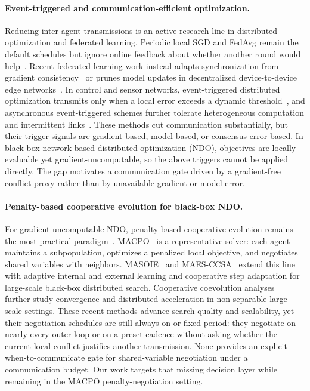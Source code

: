\documentclass[conference]{IEEEtran}
\begin{document}
\paragraph{Event-triggered and communication-efficient optimization.}
Reducing inter-agent transmissions is an active research line in distributed optimization and federated learning. Periodic local SGD and FedAvg remain the default schedules but ignore online feedback about whether another round would help~\cite{ref_stich_local_sgd_2019,ref_mcmahan_fedavg_2017,ref_koloskova_decsgd_2020}. Recent federated-learning work instead adapts synchronization from gradient consistency~\cite{ref_gift_fl_2023} or prunes model updates in decentralized device-to-device edge networks~\cite{ref_dfl_prune_tnse_2025}. In control and sensor networks, event-triggered distributed optimization transmits only when a local error exceeds a dynamic threshold~\cite{ref_et_nonconvex_tac_2023}, and asynchronous event-triggered schemes further tolerate heterogeneous computation and intermittent links~\cite{ref_daaet_tac_2024}. These methods cut communication substantially, but their trigger signals are gradient-based, model-based, or consensus-error-based. In black-box network-based distributed optimization (NDO), objectives are locally evaluable yet gradient-uncomputable, so the above triggers cannot be applied directly. The gap motivates a communication gate driven by a gradient-free conflict proxy rather than by unavailable gradient or model error.

\paragraph{Penalty-based cooperative evolution for black-box NDO.}
For gradient-uncomputable NDO, penalty-based cooperative evolution remains the most practical paradigm~\cite{ref_potter_dejong,ref_cc_dist_accel_2024}. MACPO~\cite{ref_macpo} is a representative solver: each agent maintains a subpopulation, optimizes a penalized local objective, and negotiates shared variables with neighbors. MASOIE~\cite{ref_masoie_2024} and MAES-CCSA~\cite{ref_maes_ccsa_2025} extend this line with adaptive internal and external learning and cooperative step adaptation for large-scale black-box distributed search. Cooperative coevolution analyses~\cite{ref_cc_dist_accel_2024} further study convergence and distributed acceleration in non-separable large-scale settings. These recent methods advance search quality and scalability, yet their negotiation schedules are still always-on or fixed-period: they negotiate on nearly every outer loop or on a preset cadence without asking whether the current local conflict justifies another transmission. None provides an explicit when-to-communicate gate for shared-variable negotiation under a communication budget. Our work targets that missing decision layer while remaining in the MACPO penalty-negotiation setting.
\end{document}
